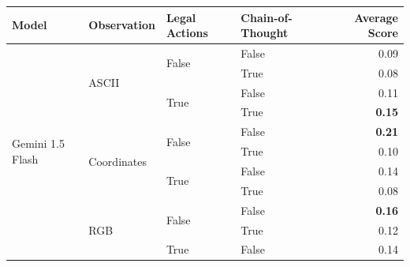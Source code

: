 \begin{tabular}{@{}llllr@{}}
    \toprule
    \textbf{Model}                              & \textbf{Observation}              & \textbf{Legal Actions}    & \textbf{Chain-of-Thought} & \textbf{Average Score} \\
    \midrule
    \multirow[c]{13}{*}{Gemini 1.5 Flash}       & \multirow[c]{4}{*}{ASCII}         & \multirow[c]{2}{*}{False} & False                     & 0.09 \\
                                                &                                   &                           & True                      & 0.08 \\
                                                &                                   & \multirow[c]{2}{*}{True}  & False                     & 0.11 \\
                                                &                                   &                           & True                      & \textbf{0.15} \\
    \cmidrule{2-5}                                                                                                                             
                                                & \multirow[c]{4}{*}{Coordinates}   & \multirow[c]{2}{*}{False} & False                     & \textbf{0.21} \\
                                                &                                   &                           & True                      & 0.10 \\
                                                &                                   & \multirow[c]{2}{*}{True}  & False                     & 0.14 \\
                                                &                                   &                           & True                      & 0.08 \\
    \cmidrule{2-5}                                                                                                                             
                                                & \multirow[c]{4}{*}{RGB}           & \multirow[c]{2}{*}{False} & False                     & \textbf{0.16} \\
                                                &                                   &                           & True                      & 0.12 \\
                                                &                                   & \multirow[c]{2}{*}{True}  & False                     & 0.14 \\

\end{tabular}
